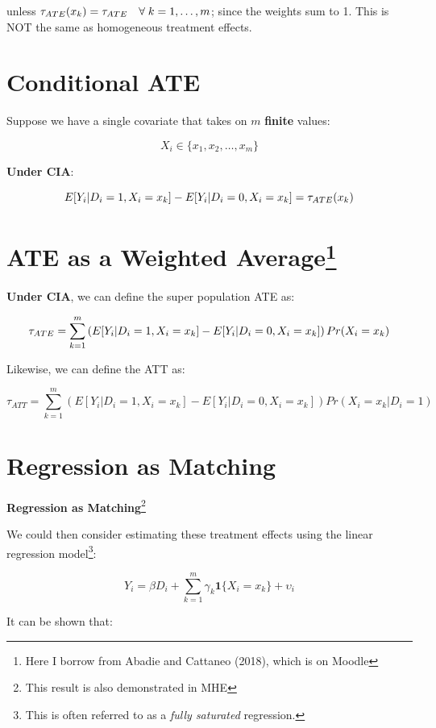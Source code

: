 \documentclass[
  letterpaper,
  DIV=11,
  numbers=noendperiod]{scrreprt}
\theoremstyle{definition}
\theoremstyle{remark}
\begin{document}
unless
\(\tau_{\scriptsize{ATE}}(x_k) = \tau_{\scriptsize{ATE}} \quad \forall \; k=1, \ldots, m\);
since the weights sum to 1. This is NOT the same as homogeneous
treatment effects.

\chapter{Conditional ATE}\label{conditional-ate-1}

Suppose we have a single covariate that takes on \(m\) \textbf{finite}
values:

\[
X_i \in \{x_1, x_2, \ldots, x_m\}
\]

\textbf{Under CIA}:

\[
E[Y_i | D_i = 1, X_i = x_k] - E[Y_i | D_i = 0, X_i = x_k] = \tau_{\scriptsize{ATE}}(x_k)
\]

\chapter[ATE as a Weighted Average]{\texorpdfstring{ATE as a Weighted
Average\footnote{Here I borrow from Abadie and Cattaneo (2018), which is
  on Moodle}}{ATE as a Weighted Average}}\label{ate-as-a-weighted-averagecef-5}

\textbf{Under CIA}, we can define the super population ATE as:

\[
\tau_{\scriptsize{ATE}} = \sum_{k=1}^{m} \left( E[Y_i | D_i = 1, X_i = x_k] - E[Y_i | D_i = 0, X_i = x_k] \right) Pr(X_i = x_k)
\]

Likewise, we can define the ATT as:

\[
\tau_{ATT} = \sum_{k=1}^{m} \left( E[Y_i | D_i = 1, X_i = x_k] - E[Y_i | D_i = 0, X_i = x_k] \right) Pr(X_i = x_k | D_i = 1)
\]

\chapter{Regression as Matching}\label{regression-as-matching-1}

\textbf{Regression as Matching}\footnote{This result is also
  demonstrated in MHE}

We could then consider estimating these treatment effects using the
linear regression model\footnote{This is often referred to as a
  \emph{fully saturated} regression.}:

\[
Y_i = \beta D_i + \sum_{k=1}^{m} \gamma_k \mathbf{1} \{X_i = x_k\} + \upsilon_i
\]

It can be shown that:
\end{document}
